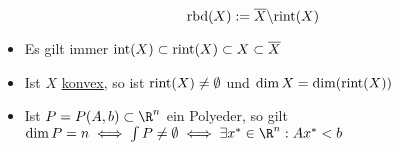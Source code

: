 \begin{itemize}
		\begin{equation*}
			\text{rbd}(X) := \overline{X}\backslash \text{rint}(X)
		\end{equation*}
	\begin{bemerkung}
		\begin{itemize}\
			\item Es gilt immer $\text{int}(X)\subset \text{rint}(X) \subset X \subset \overline{X}$
			\item Ist $X$ \underline{konvex}, so ist $\text{rint}(X)\neq \emptyset$ und $\dim X= \dim(\text{rint}(X))$
			\item Ist  $P = P(A,b) \subset \R^n$ ein Polyeder, so gilt $\dim P=n \iff \int P \neq \emptyset \iff \exists x^* \in \R^n: Ax^*<b$
		\end{itemize}
	\end{bemerkung}
\end{itemize}
